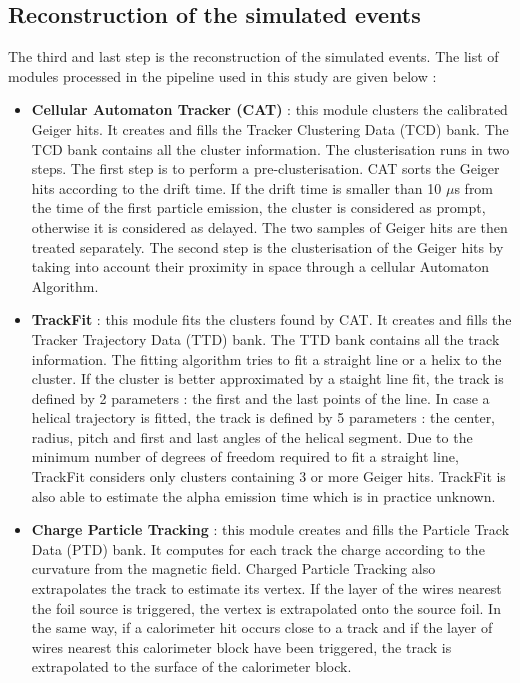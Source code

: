 \documentclass[main.tex]{subfiles}
\begin{document}
\FloatBarrier


\subsection{Reconstruction of the simulated events}\label{sec:ReconstructionBi214}


\noindent The third and last step is the reconstruction of the simulated events. The list of modules processed in the pipeline used in this study are given below : 


\begin{itemize}


\item \textbf{Cellular Automaton Tracker (CAT)} : this module clusters the calibrated Geiger hits. It creates and fills the Tracker Clustering Data (TCD) bank. The TCD bank contains all the cluster information. The clusterisation runs in two steps. The first step is to perform a pre-clusterisation. CAT sorts the Geiger hits according to the drift time. If the drift time is smaller than 10 $\mu$s from the time of the first particle emission, the cluster is considered as prompt, otherwise it is considered as delayed. The two samples of Geiger hits are then treated separately. The second step is the clusterisation of the Geiger hits by taking into  account their proximity in space through a cellular Automaton Algorithm. %

\item \textbf{TrackFit} : this module fits the clusters found by CAT. It creates and fills the Tracker Trajectory Data (TTD) bank. The TTD bank contains all the track information. The fitting algorithm tries to fit a straight line or a helix to the cluster. If the cluster is better approximated by a staight line fit, the track is defined by 2 parameters : the first and the last points of the line. In case a helical trajectory is fitted, the track is defined by 5 parameters : the center, radius, pitch and first and last angles of the helical segment. Due to the minimum number of degrees of freedom required to fit a straight line, TrackFit considers only clusters containing 3 or more Geiger hits. TrackFit is also able to estimate the alpha emission time which is in practice unknown. %

\item \textbf{Charge Particle Tracking} : this module creates and fills the Particle Track Data (PTD) bank. It computes for each track the charge according to the curvature from the magnetic field.  Charged Particle Tracking also extrapolates the track to estimate its vertex. If the layer of the wires nearest the foil source is triggered, the vertex is extrapolated onto the source foil. In the same way, if a calorimeter hit occurs close to a track and if the layer of wires nearest this calorimeter block have been triggered, the track is extrapolated to the surface of the calorimeter block.
\end{itemize}
\end{document}
